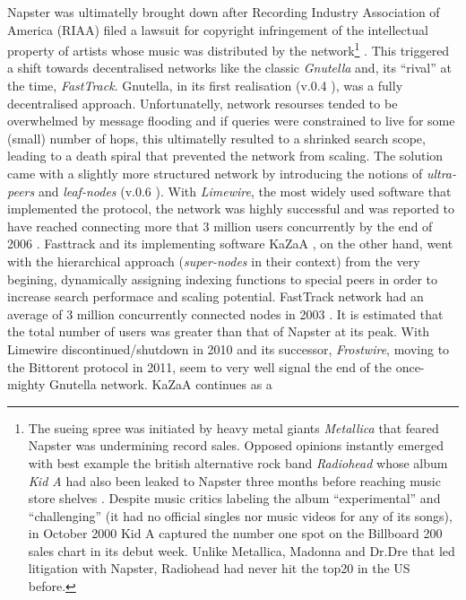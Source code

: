 Napster was ultimatelly brought down after Recording Industry Association of
America (RIAA) filed a lawsuit for copyright infringement of the intellectual
property of artists whose music was distributed by the network\footnote{
  The sueing spree was initiated by heavy metal giants \emph{Metallica} that
  feared Napster was undermining record sales. Opposed opinions instantly
  emerged with best example the british alternative rock band \emph{Radiohead}
  whose album \emph{Kid A} had also been leaked to Napster three months before
  reaching music store shelves \cite{rm_radioheadkida_2000}. Despite music
  critics labeling the album ``experimental'' and ``challenging'' (it had no
  official singles nor music videos for any of its songs), in October 2000 Kid A
  captured the number one spot on the Billboard 200 sales chart in its debut
  week. Unlike Metallica, Madonna and Dr.Dre that led litigation with Napster,
  Radiohead had never hit the top20 in the US before.
}
\cite{wiki_amnaptrial_2001}. This triggered a shift towards decentralised
networks like the classic \emph{Gnutella} and, its ``rival'' at the time,
\emph{FastTrack}. Gnutella, in its first realisation (v.0.4 \cite{gnutellav04}),
was a fully decentralised approach. Unfortunatelly, network resourses tended to
be overwhelmed by message flooding and if queries were constrained to live for
some (small) number of hops, this ultimatelly resulted to a shrinked search
scope, leading to a death spiral that prevented the network from scaling. The
solution came with a slightly more structured network by introducing the notions
of \emph{ultra-peers} and \emph{leaf-nodes} (v.0.6 \cite{gnutella}). With
\emph{Limewire}, the most widely used software that implemented the protocol,
the network was highly successful and was reported to have reached connecting
more that 3 million users concurrently by the end of 2006
\cite{rsr_gnutellaevol_2006}. Fasttrack and its implementing software KaZaA
\cite{kazaa}, on the other hand, went with the hierarchical approach
(\emph{super-nodes} in their context) from the very begining, dynamically
assigning indexing functions to special peers in order to increase search
performace and scaling potential. FastTrack network had an average of 3 million
concurrently connected nodes in 2003 \cite{lkxr_kazaameasure_2005}. It is
estimated that the total number of users was greater than that of Napster at its
peak. With Limewire discontinued/shutdown in 2010 and its successor,
\emph{Frostwire}, moving to the Bittorent protocol in 2011, seem to very well
signal the end of the once-mighty Gnutella network. KaZaA continues as a
